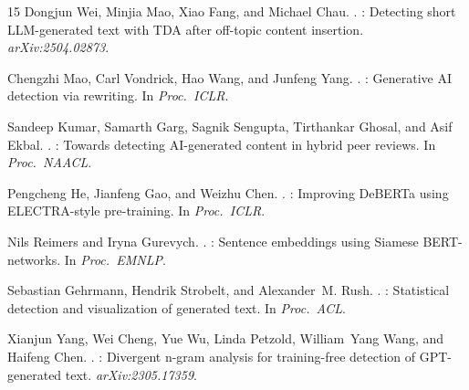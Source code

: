 \documentclass[11pt]{article}
\begin{document}
\begin{thebibliography}{15}
Dongjun Wei, Minjia Mao, Xiao Fang, and Michael Chau.
.
: Detecting short {LLM}-generated text with TDA after off-topic content insertion.
\newblock \emph{arXiv:2504.02873}.

Chengzhi Mao, Carl Vondrick, Hao Wang, and Junfeng Yang.
.
: Generative {AI} detection via rewriting.
\newblock In \emph{Proc.\ ICLR}.

Sandeep Kumar, Samarth Garg, Sagnik Sengupta, Tirthankar Ghosal, and Asif Ekbal.
.
: Towards detecting {AI}-generated content in hybrid peer reviews.
\newblock In \emph{Proc.\ NAACL}.

Pengcheng He, Jianfeng Gao, and Weizhu Chen.
.
: Improving {DeBERTa} using {ELECTRA}-style pre-training.
\newblock In \emph{Proc.\ ICLR}.

Nils Reimers and Iryna Gurevych.
.
: Sentence embeddings using {S}iamese {BERT}-networks.
\newblock In \emph{Proc.\ EMNLP}.

Sebastian Gehrmann, Hendrik Strobelt, and Alexander~M. Rush.
.
: Statistical detection and visualization of generated text.
\newblock In \emph{Proc.\ ACL}.

Xianjun Yang, Wei Cheng, Yue Wu, Linda Petzold, William~Yang Wang, and Haifeng Chen.
.
: Divergent n-gram analysis for training-free detection of {GPT}-generated text.
\newblock \emph{arXiv:2305.17359}.

\end{thebibliography}
\end{document}
